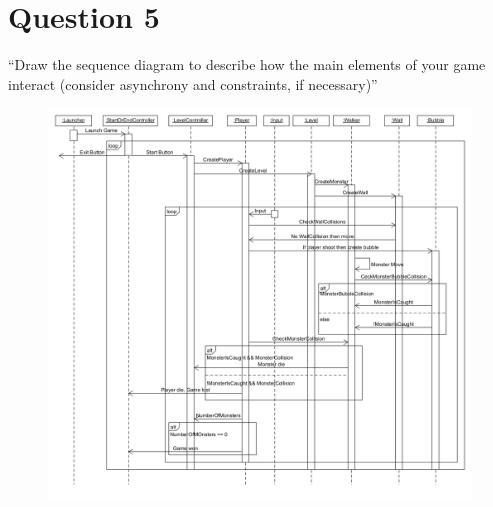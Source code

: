 \section{Question 5}
``Draw the sequence diagram to describe how the main elements of your game interact (consider asynchrony and constraints, if necessary)''

\begin{figure}[h]
\includegraphics[width=\textwidth]{SequenceDiagram}
\end{figure}
